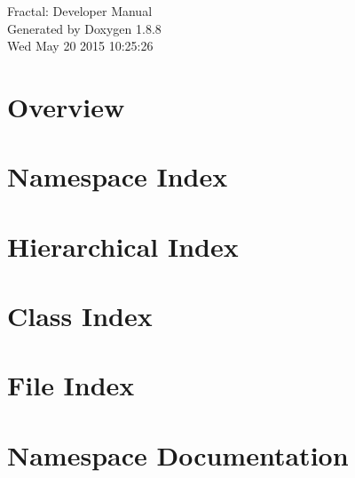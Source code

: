 \documentclass[twoside]{book}
\newcommand{\+}{\discretionary{\mbox{\scriptsize$\hookleftarrow$}}{}{}}
\newcommand{\clearemptydoublepage}{%
  \newpage{\pagestyle{empty}\cleardoublepage}%
}
\begin{document}
\hypersetup{pageanchor=false,
             bookmarks=true,
             bookmarksnumbered=true,
             pdfencoding=unicode
            }
\begin{titlepage}
\vspace*{7cm}
\begin{center}%
{\Large Fractal\+: Developer Manual }\\
\vspace*{1cm}
{\large Generated by Doxygen 1.8.8}\\
\vspace*{0.5cm}
{\small Wed May 20 2015 10:25:26}\\
\end{center}
\end{titlepage}
\clearemptydoublepage
\tableofcontents
\clearemptydoublepage
{}
\hypersetup{pageanchor=true}

\chapter{Overview}
\label{index}\hypertarget{index}{}
\chapter{Namespace Index}

\chapter{Hierarchical Index}

\chapter{Class Index}

\chapter{File Index}

\chapter{Namespace Documentation}



\end{document}
